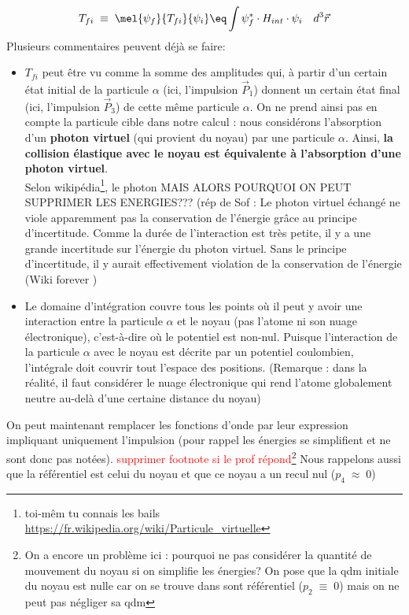 \begin{equation*}
    T_{fi} 
    \; \equiv \;
    \mel{\psi_f}{T_{fi}}{\psi_i}
    \eq
    \int \psi_f^* \cdot H_{int} \cdot \psi_i \quad d^3\vec{r}
\end{equation*}
Plusieurs commentaires peuvent déjà se faire:
\begin{itemize}[label=$\bullet$]

    \item $T_{fi}$ peut être vu comme la somme des amplitudes qui, à partir d'un certain état initial de la particule $\alpha$ (ici, l'impulsion $\vec{P}_1$) donnent un certain état final (ici, l'impulsion $\vec{P}_3$) de cette même particule $\alpha$. On ne prend ainsi pas en compte la particule cible dans notre calcul : nous considérons l'absorption d'un \textbf{photon virtuel} (qui provient du noyau) par une particule $\alpha$. Ainsi, \textbf{la collision élastique avec le noyau est équivalente à l'absorption d'une photon virtuel}.\\
    Selon wikipédia\footnote{toi-mêm tu connais les bails \url{https://fr.wikipedia.org/wiki/Particule_virtuelle}}, le photon 
    MAIS ALORS POURQUOI ON PEUT SUPPRIMER LES ENERGIES??? (rép de Sof :  Le photon virtuel échangé ne viole apparemment pas la conservation de l'énergie grâce au principe d'incertitude. Comme la durée de l'interaction est très petite, il y a une grande incertitude sur l'énergie du photon virtuel. Sans le principe d'incertitude, il y aurait effectivement violation de la conservation de l'énergie (Wiki forever  )\\
    
    \item Le domaine d'intégration couvre tous les points où il peut y avoir une interaction entre la particule $\alpha$ et le noyau (pas l'atome ni son nuage électronique), c'est-à-dire où le potentiel est non-nul. Puisque l'interaction de la particule $\alpha$ avec le noyau est décrite par un potentiel coulombien, l'intégrale doit couvrir tout l'espace des positions. (Remarque : dans la réalité, il faut considérer le nuage électronique qui rend l'atome globalement neutre au-delà d'une certaine distance du noyau)
    
\end{itemize}
On peut maintenant remplacer les fonctions d'onde par leur expression impliquant uniquement l'impulsion (pour rappel les énergies se simplifient et ne sont donc pas notées). \textcolor{red}{supprimer footnote si le prof répond}\footnote{On a encore un problème ici : pourquoi ne pas considérer la quantité de mouvement du noyau si on simplifie les énergies? On pose que la qdm initiale du noyau est nulle car on se trouve dans sont référentiel ($p_2\;\equiv\;0$) mais on ne peut pas négliger sa qdm}
Nous rappelons aussi que la référentiel est celui du noyau  et que ce noyau a un recul nul ($p_4\;\approx\;0$)

